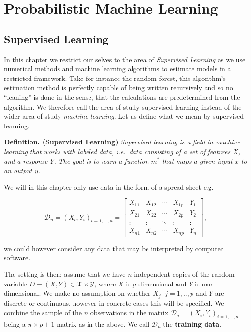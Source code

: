 \documentclass[a4paper,12pt,openany]{book}
\begin{document}
\hypertarget{probabilistic-machine-learning}{%
\chapter{Probabilistic Machine Learning}\label{probabilistic-machine-learning}}

\hypertarget{supervised-learning}{%
\section{Supervised Learning}\label{supervised-learning}}

In this chapter we restrict our selves to the area of \emph{Supervised Learning} as we use numerical methods and machine learning algorithms to estimate models in a restricted framework. Take for instance the random forest, this algorithm's estimation method is perfectly capable of being written recursively and so no ``leaning'' is done in the sense, that the calculations are predetermined from the algorithm. We therefore call the area of study supervised learning instead of the wider area of study \emph{machine learning}. Let us define what we mean by supervised learning.

\textbf{Definition. (Supervised Learning)} \emph{Supervised learning is a field in machine learning that works with labeled data, i.e.~data consisting of a set of features \(X\), and a response \(Y\). The goal is to learn a function \(m^*\) that maps a given input \(x\) to an output \(y\).}

We will in this chapter only use data in the form of a spread sheet e.g.

\[
\mathcal{D}_n=
\left(X_i, Y_i \right)_{i=1,...,n}=
\left[
\begin{array}{cccc|c}
X_{11} & X_{12} & \cdots & X_{1p} & Y_1\\
X_{21} & X_{22} & \cdots & X_{2p} & Y_2\\
\vdots & \vdots & \ddots & \vdots & \vdots\\
X_{n1} & X_{n2} & \cdots & X_{np} & Y_n
\end{array}
\right],
\]

we could however consider any data that may be interpreted by computer software.

The setting is then; assume that we have \(n\) independent copies of the random variable \(D=(X,Y)\in \mathcal{X}\times \mathcal{Y}\), where \(X\) is \(p\)-dimensional and \(Y\) is one-dimensional. We make no assumption on whether \(X_j\), \(j=1,..,p\) and \(Y\) are discrete or continuous, however in concrete cases this will be specified. We combine the sample of the \(n\) observations in the matrix \(\mathcal{D}_n=(X_i,Y_i)_{i=1,...,n}\) being a \(n\times p+1\) matrix as in the above. We call \(\mathcal{D}_n\) the \textbf{training data}.
\end{document}
